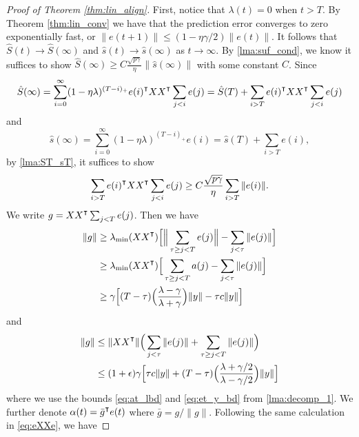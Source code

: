\begin{proof}[Proof of Theorem \ref{thm:lin_align}]
First, notice that $\lambda(t)=0$ when $t>T$. By Theorem \ref{thm:lin_conv} we have that the prediction error converges to zero exponentially fast, or $\|e(t+1)\|\leq (1-\eta\gamma/2)\|e(t)\|$. It follows that $\hat{S}(t)\to \hat{S}(\infty)$ and $\hat{s}(t)\to \hat{s}(\infty)$ as $t\to\infty$. By \cref{lma:suf_cond}, we know it suffices to show $\hat{S}(\infty)\geq C\frac{\sqrt{p\gamma}}{\eta}\|\hat{s}(\infty)\|$ with some constant $C$. Since
\begin{equation*}
\hat{S}(\infty) = \sum_{i=0}^\infty(1-\eta\lambda)^{(T-i)_+}e(i)\transpose XX\transpose \sum_{j<i} e(j) = \hat{S}(T)+ \sum_{i>T}e(i)\transpose XX\transpose \sum_{j<i}e(j)
\end{equation*}
and
\begin{equation*}
\hat{s}(\infty) = \sum_{i=0}^\infty(1-\eta\lambda)^{(T-i)_+}e(i)= \hat{s}(T)+ \sum_{i>T}e(i),
\end{equation*}
by \cref{lma:ST_sT}, it suffices to show
\begin{equation}
\label{eq:exxe_e_bd}
    \sum_{i>T}e(i)\transpose XX\transpose \sum_{j<i}e(j) \geq C\frac{\sqrt{p\gamma}}{\eta}\sum_{i>T}\|e(i)\|.
\end{equation}
We write $g = XX\transpose \sum_{j<T}e(j)$. Then we have
\begin{equation}
\label{eq:g_lbd}
\begin{aligned}
\|g\| &\geq \lambda_{\min}(XX\transpose) \Big[\Big\|\sum_{\tau\geq j<T}e(j)\Big\|-\sum_{j<\tau}\|e(j)\|\Big] \\
&\geq\lambda_{\min}(XX\transpose) \Big[\sum_{\tau\geq j<T}a(j)-\sum_{j<\tau}\|e(j)\|\Big] \\
&\geq \gamma\Big[(T-\tau)\Big(\frac{\lambda-\gamma}{\lambda+\gamma}\Big)\|y\| - \tau c\|y\|\Big]
\end{aligned}
\end{equation}
and
\begin{equation}
\label{eq:g_ubd}
\begin{aligned}
\|g\| &\leq \|XX\transpose\| \Big(\sum_{j<\tau}\|e(j)\| + \sum_{\tau\geq j<T}\|e(j)\|\Big) \\
&\leq (1+\epsilon)\gamma\Big[\tau c\|y\|+ (T-\tau)\Big(\frac{\lambda+\gamma/2}{\lambda-\gamma/2}\Big)\|y\|\Big]
\end{aligned}
\end{equation}
where we use the bounds \eqref{eq:at_lbd} and \eqref{eq:et_y_bd} from \cref{lma:decomp_1}. We further denote $\alpha(t) = \bar{g}\transpose e(t)$ where $\bar{g} = g/\|g\|$. Following the same calculation in \eqref{eq:eXXe}, we have

\end{proof}

